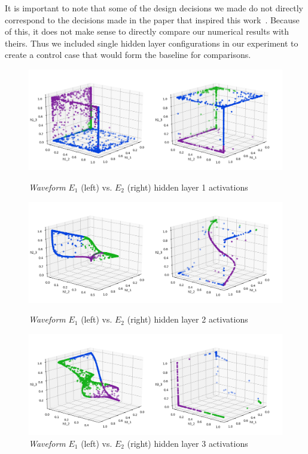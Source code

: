 It is important to note that some of the design decisions we
made do not directly correspond to the decisions made in the paper
that inspired this work~\cite{thuan11}. Because of this, it does not
make sense to directly compare our numerical results with theirs.
Thus we included single hidden layer
configurations in our experiment to create a control case that would
form the baseline for comparisons. 

\begin{figure} 
  \includegraphics[width=\columnwidth]{4_4_4_h1_Seed_10_train_3d.png}
  \caption{\textit{Waveform} $E_1$ (left) vs. $E_2$ (right) hidden layer 1 activations}
  \label{fig:waveform_3d_1}    
    \endminipage\hfill
{}
  \includegraphics[width=\columnwidth]{4_4_4_h2_Seed_10_train_3d.png}
  \caption{\textit{Waveform} $E_1$ (left) vs. $E_2$ (right) hidden layer 2 activations}
  \label{fig:waveform_3d_2}    
\endminipage\hfill
{}
  \includegraphics[width=\columnwidth]{4_4_4_h3_Seed_10_train_3d.png}
  \caption{\textit{Waveform} $E_1$ (left) vs. $E_2$ (right) hidden layer 3 activations}
  \label{fig:waveform_3d_3}  
\endminipage
\end{figure}

